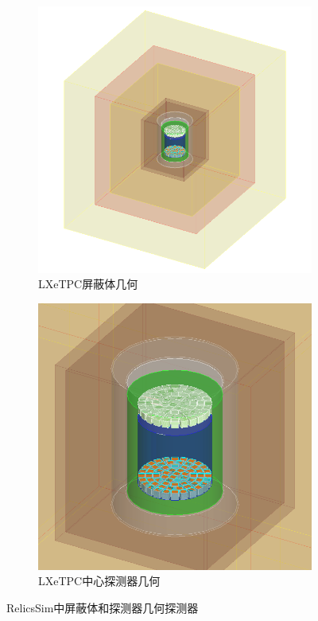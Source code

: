 \begin{figure}
  \begin{subfigure}{.5\textwidth}
    \centering
    \includegraphics[width=1.0\linewidth]{figures/relics_outer.png}
    \caption{\label{fig:relics_outer} LXeTPC屏蔽体几何}
  \end{subfigure}
  \begin{subfigure}{.5\textwidth}
    \centering
    \includegraphics[width=1.0\linewidth]{figures/relics_inner.png}
    \caption{\label{fig:relics_inner} LXeTPC中心探测器几何}
  \end{subfigure}
  \caption{\label{fig:relics_g4} RelicsSim中屏蔽体和探测器几何探测器}
\end{figure}

